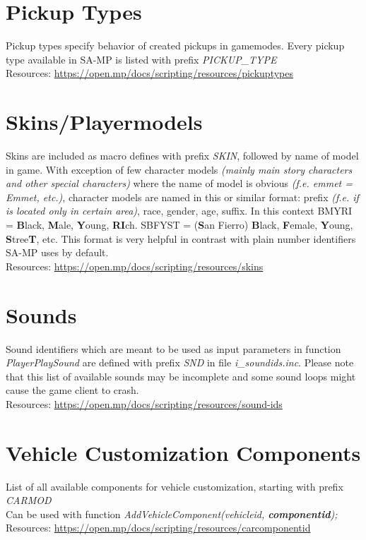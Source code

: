 \documentclass{article}
\begin{document}
\section{Pickup Types}
Pickup types specify behavior of created pickups in gamemodes. Every pickup type available in SA-MP is listed with prefix \textit{PICKUP\_TYPE}
\bigskip
\\Resources: \url{https://open.mp/docs/scripting/resources/pickuptypes}

\section{Skins/Playermodels}
Skins are included as macro defines with prefix \textit{SKIN}, followed by name of model in game. With exception of few character models \textit{(mainly main story characters and other special characters)} where the name of model is obvious \textit{(f.e. emmet = Emmet, etc.)}, character models are named in this or similar format: prefix \textit{(f.e. if is located only in certain area)}, race, gender, age, suffix. In this context BMYRI = \textbf{B}lack, \textbf{M}ale, \textbf{Y}oung, \textbf{RI}ch. SBFYST = (\textbf{S}an Fierro) \textbf{B}lack, \textbf{F}emale, \textbf{Y}oung, \textbf{S}tree\textbf{T}, etc. This format is very helpful in contrast with plain number identifiers SA-MP uses by default.
\bigskip
\\Resources: \url{https://open.mp/docs/scripting/resources/skins}

\section{Sounds}
Sound identifiers which are meant to be used as input parameters in function \textit{PlayerPlaySound} are defined with prefix \textit{SND} in file \textit{i\_soundids.inc}. Please note that this list of available sounds may be incomplete and some sound loops might cause the game client to crash.
\bigskip
\\Resources: \url{https://open.mp/docs/scripting/resources/sound-ids}

\section{Vehicle Customization Components}
List of all available components for vehicle customization, starting with prefix \textit{CARMOD}\\Can be used with function \textit{AddVehicleComponent(vehicleid, \textbf{componentid});}
\bigskip
\\Resources: \url{https://open.mp/docs/scripting/resources/carcomponentid}
\end{document}

